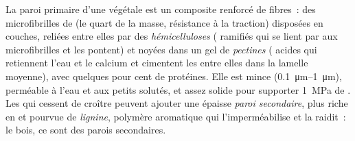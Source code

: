 \begin{proposition}\label{prop:b1:carbohydrates:wall}
La paroi primaire d'une  végétale est un composite renforcé de
fibres~: des microfibrilles de  (le quart de la masse,
résistance à la traction) disposées en couches, reliées entre elles par
des \emph{hémicelluloses} ( ramifiés qui se lient par
 aux microfibrilles et les pontent) et noyées dans un
gel de \emph{pectines} ( acides qui retiennent l'eau et
le calcium et cimentent les  entre elles dans la lamelle
moyenne), avec quelques pour cent de protéines. Elle est mince
(\qtyrange{0.1}{1}{\micro m}), perméable à l'eau et aux petits solutés,
et assez solide pour supporter \qty{1}{MPa} de . Les 
qui cessent de croître peuvent ajouter une épaisse \emph{paroi
secondaire}, plus riche en  et pourvue de \emph{lignine},
polymère aromatique qui l'imperméabilise et la raidit~: le bois, ce sont
des parois secondaires.
\end{proposition}

